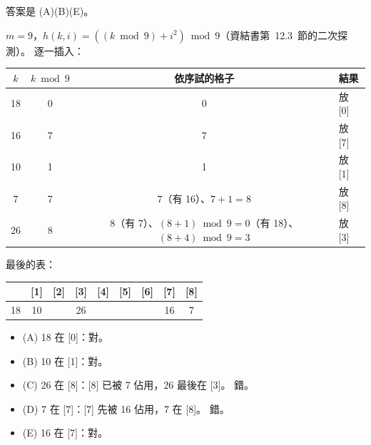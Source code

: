 \begin{pastsoln}
答案是 (A)(B)(E)。

$m = 9$，$h(k, i) = ((k \bmod 9) + i^2) \bmod 9$（資結書第~12.3~節的二次探測）。 逐一插入：
\begin{center}
\small
\begin{tabular}{cccl}
\toprule
$k$ & $k \bmod 9$ & 依序試的格子 & 結果 \\
\midrule
18 & 0 & 0 & 放 [0] \\
16 & 7 & 7 & 放 [7] \\
10 & 1 & 1 & 放 [1] \\
7 & 7 & 7（有 16）、$7 + 1 = 8$ & 放 [8] \\
26 & 8 & 8（有 7）、$(8 + 1) \bmod 9 = 0$（有 18）、$(8 + 4) \bmod 9 = 3$ & 放 [3] \\
\bottomrule
\end{tabular}
\end{center}
最後的表：
\begin{center}
\begin{tabular}{|*{9}{c|}}
\hline
[0] & [1] & [2] & [3] & [4] & [5] & [6] & [7] & [8] \\ \hline
18 & 10 & & 26 & & & & 16 & 7 \\ \hline
\end{tabular}
\end{center}
\begin{itemize}
\item (A) 18 在 [0]：對。
\item (B) 10 在 [1]：對。
\item (C) 26 在 [8]：[8] 已被 7 佔用，26 最後在 [3]。 錯。
\item (D) 7 在 [7]：[7] 先被 16 佔用，7 在 [8]。 錯。
\item (E) 16 在 [7]：對。
\end{itemize}
\end{pastsoln}

